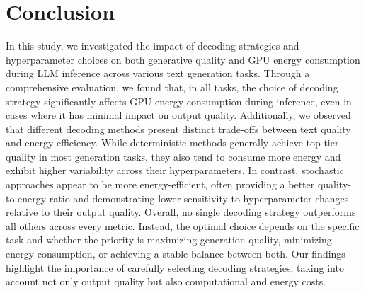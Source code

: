 \section{Conclusion}
\label{conclusion}

In this study, we investigated the impact of decoding strategies and hyperparameter choices on both generative quality and GPU energy consumption during LLM inference across various text generation tasks. Through a comprehensive evaluation, we found that, in all tasks, the choice of decoding strategy significantly affects GPU energy consumption during inference, even in cases where it has minimal impact on output quality. Additionally, we observed that different decoding methods present distinct trade-offs between text quality and energy efficiency. While deterministic methods generally achieve top-tier quality in most generation tasks, they also tend to consume more energy and exhibit higher variability across their hyperparameters. In contrast, stochastic approaches appear to be more energy-efficient, often providing a better quality-to-energy ratio and demonstrating lower sensitivity to hyperparameter changes relative to their output quality. Overall, no single decoding strategy outperforms all others across every metric. Instead, the optimal choice depends on the specific task and whether the priority is maximizing generation quality, minimizing energy consumption, or achieving a stable balance between both. Our findings highlight the importance of carefully selecting decoding strategies, taking into account not only output quality but also computational and energy costs.